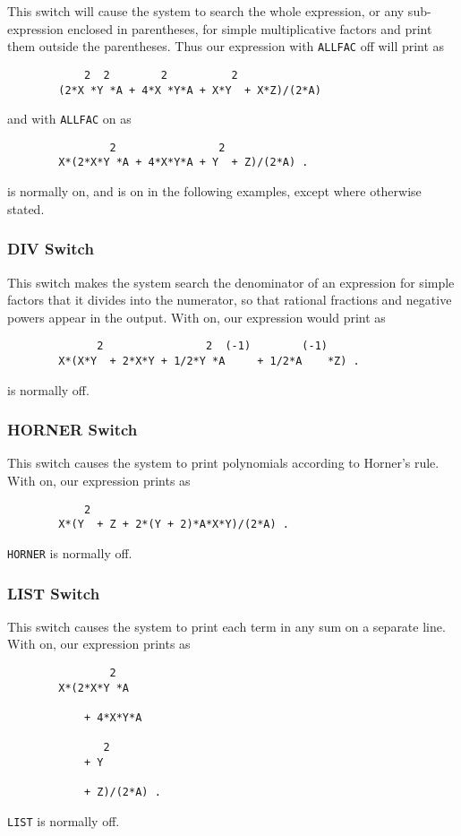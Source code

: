 This switch will cause the system to search the whole expression, or any
sub-expression enclosed in parentheses, for simple multiplicative factors
and print them outside the parentheses. Thus our expression with \texttt{ALLFAC}
off will print as
\begin{verbatim}
            2  2        2          2
        (2*X *Y *A + 4*X *Y*A + X*Y  + X*Z)/(2*A)
\end{verbatim}
and with \texttt{ALLFAC} on as
\begin{verbatim}
                2                2
        X*(2*X*Y *A + 4*X*Y*A + Y  + Z)/(2*A) .
\end{verbatim}
 is normally on, and is on in the following examples, except
where otherwise stated.

\subsubsection{DIV Switch}
\hypertarget{switch:DIV}{}

This switch makes the system search the denominator of an expression for
simple factors that it divides into the numerator, so that rational
fractions and negative powers appear in the output. With  on, our
expression would print as
\begin{verbatim}
              2                2  (-1)        (-1)
        X*(X*Y  + 2*X*Y + 1/2*Y *A     + 1/2*A    *Z) .
\end{verbatim}
 is normally off.

\subsubsection{HORNER Switch}
\hypertarget{switch:HORNER}{}

This switch causes the system to print polynomials according to Horner's rule.
With  on, our expression prints as
\begin{verbatim}
            2
        X*(Y  + Z + 2*(Y + 2)*A*X*Y)/(2*A) .
\end{verbatim}
\texttt{HORNER} is normally off.

\subsubsection{LIST Switch}
\hypertarget{switch:LIST}{}

This switch causes the system to print each term in any sum on a separate
line. With  on, our expression prints as
\begin{verbatim}
                2
        X*(2*X*Y *A

            + 4*X*Y*A

               2
            + Y

            + Z)/(2*A) .
\end{verbatim}
\texttt{LIST} is normally off.

